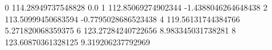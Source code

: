 0 114.28949737548828 0.0
1 112.85069274902344 -1.4388046264648438
2 113.50999450683594 -0.7795028686523438
4 119.56131744384766 5.271820068359375
6 123.27284240722656 8.983345031738281
8 123.60870361328125 9.319206237792969
